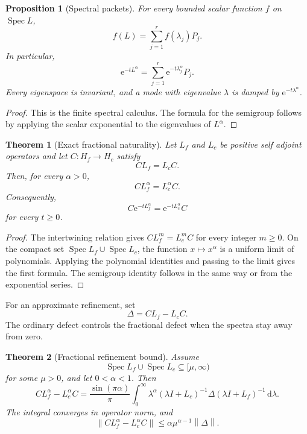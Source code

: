 \documentclass{aomart}
\newtheorem{theorem}{Theorem}[section]
\newtheorem{proposition}[proposition]{Proposition}
\theoremstyle{definition}
\theoremstyle{remark}
\newcommand{\e}{\mathrm e}
\newcommand{\dd}{\,\mathrm d}
\newcommand{\Spec}{\operatorname{Spec}}
\newcommand{\norm}[1]{\left\lVert#1\right\rVert}
\begin{document}
\begin{proposition}[Spectral packets]\label{prop:spectral_packets}
For every bounded scalar function \(f\) on \(\Spec L\),
\[
f(L)=\sum_{j=1}^{r}f(\lambda_j)P_j.
\]
In particular,
\[
\e^{-tL^\alpha}
=
\sum_{j=1}^{r}\e^{-t\lambda_j^\alpha}P_j.
\]
Every eigenspace is invariant, and a mode with eigenvalue \(\lambda\) is damped by \(\e^{-t\lambda^\alpha}\).
\end{proposition}

\begin{proof}
This is the finite spectral calculus. The formula for the semigroup follows by applying the scalar exponential to the eigenvalues of \(L^\alpha\).
\end{proof}

\begin{theorem}[Exact fractional naturality]\label{thm:exact_fractional_naturality}
Let \(L_f\) and \(L_c\) be positive self adjoint operators and let \(C:H_f\to H_c\) satisfy
\[
CL_f=L_cC.
\]
Then, for every \(\alpha>0\),
\[
\boxed{
CL_f^\alpha=L_c^\alpha C.
}
\]
Consequently,
\[
C\e^{-tL_f^\alpha}
=
\e^{-tL_c^\alpha}C
\]
for every \(t\geq0\).
\end{theorem}

\begin{proof}
The intertwining relation gives \(CL_f^m=L_c^mC\) for every integer \(m\geq0\). On the compact set \(\Spec L_f\cup\Spec L_c\), the function \(x\mapsto x^\alpha\) is a uniform limit of polynomials. Applying the polynomial identities and passing to the limit gives the first formula. The semigroup identity follows in the same way or from the exponential series.
\end{proof}

For an approximate refinement, set
\[
\Delta=CL_f-L_cC.
\]
The ordinary defect controls the fractional defect when the spectra stay away from zero.

\begin{theorem}[Fractional refinement bound]\label{thm:fractional_refinement_bound}
Assume
\[
\Spec L_f\cup\Spec L_c\subseteq[\mu,\infty)
\]
for some \(\mu>0\), and let \(0<\alpha<1\). Then
\[
\boxed{
CL_f^\alpha-L_c^\alpha C
=
\frac{\sin(\pi\alpha)}{\pi}
\int_0^\infty
\lambda^\alpha
(\lambda I+L_c)^{-1}
\Delta
(\lambda I+L_f)^{-1}
\dd\lambda.
}
\]
The integral converges in operator norm, and
\[
\boxed{
\norm{CL_f^\alpha-L_c^\alpha C}
\leq
\alpha\mu^{\alpha-1}\norm{\Delta}.
}
\]
\end{theorem}
\end{document}
